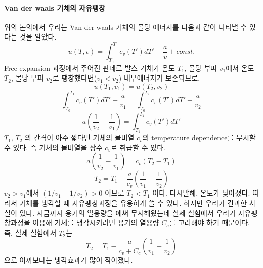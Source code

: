 \documentclass[a4paper,12pt]{article}
\begin{document}
\paragraph{Van der waals 기체의 자유팽창} 위의 논의에서 우리는 Van der waals 기체의 몰당 에너지를 다음과 같이 나타낼 수 있다는 것을 알았다.
$$u(T,v)=\int_{T_0}^{T}c_v(T')dT'-\frac{a}{v}+const.$$
Free expansion 과정에서 주어진 판데르 발스 기체가 온도 $T_1$, 몰당 부피 $v_1$에서 온도 $T_2$, 몰당 부피 $v_2$로 팽창했다면($v_1<v_2$) 내부에너지가 보존되므로,
$$u(T_1,v_1)=u(T_2,v_2)$$
$$\int_{T_0}^{T_1}c_v(T')dT'-\frac{a}{v_1}=\int_{T_0}^{T_2}c_v(T')dT'-\frac{a}{v_2}$$
$$a\left(\frac{1}{v_2}-\frac{1}{v_1} \right)=\int_{T_1}^{T_2}c_v(T')dT' $$
$T_1,\,T_2$ 의 간격이 아주 짧다면 기체의 몰비열 $c_v$의 temperature dependence를 무시할 수 있다. 즉 기체의 몰비열을 상수 $c_v$로 취급할 수 있다.
$$a\left(\frac{1}{v_2}-\frac{1}{v_1} \right)=c_v(T_2-T_1) $$
$$T_2=T_1-\frac{a}{c_v}\left(\frac{1}{v_1}-\frac{1}{v_2} \right) $$
$v_2>v_1$에서 $(1/v_1-1/v_2)>0$ 이므로 $T_2<T_1$ 이다. 다시말해, 온도가 낮아졌다. 따라서 기체를 냉각할 때 자유팽창과정을 유용하게 쓸 수 있다. 하지만 우리가 간과한 사실이 있다. 지금까지 용기의 열용량을 애써 무시해왔는데 실제 실험에서 우리가 자유팽창과정을 이용해 기체를 냉각시키려면 용기의 열용량 $C_c$를 고려해야 하기 때문이다. 즉, 실제 실험에서 $T_2$는 
$$T_2=T_1-\frac{a}{c_v+C_c}\left(\frac{1}{v_1}-\frac{1}{v_2} \right) $$ 
으로 아까보다는 냉각효과가 많이 작아졌다.
\end{document}
